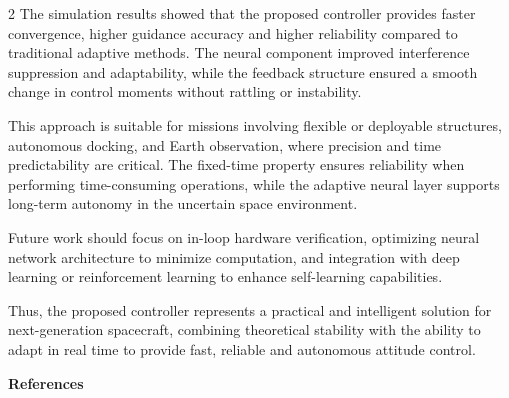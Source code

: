 \begin{multicols}{2}
The simulation results showed that the proposed controller provides
faster convergence, higher guidance accuracy and higher reliability
compared to traditional adaptive methods. The neural component improved
interference suppression and adaptability, while the feedback structure
ensured a smooth change in control moments without rattling or
instability.

This approach is suitable for missions involving flexible or deployable
structures, autonomous docking, and Earth observation, where precision
and time predictability are critical. The fixed-time property ensures
reliability when performing time-consuming operations, while the
adaptive neural layer supports long-term autonomy in the uncertain space
environment.

Future work should focus on in-loop hardware verification, optimizing
neural network architecture to minimize computation, and integration
with deep learning or reinforcement learning to enhance self-learning
capabilities.

Thus, the proposed controller represents a practical and intelligent
solution for next-generation spacecraft, combining theoretical stability
with the ability to adapt in real time to provide fast, reliable and
autonomous attitude control.
\end{multicols}

\begin{center}
{\bfseries References}
\end{center}


